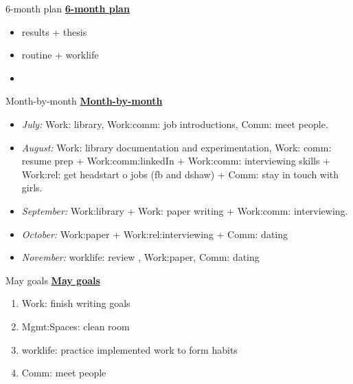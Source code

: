 \begin{columns}
\begin{column}{0.5\columnwidth}
\ifdefined\POSTER
    \begin{block}{6-month plan}
\else
\underline{\bf 6-month plan}
\fi
        \begin{itemize}
          \small \item \small results + thesis
          \item \small routine + worklife
          \item \small             
          \end{itemize}
\ifdefined\POSTER
    \end{block} 
\fi


\ifdefined\POSTER  
    \begin{block}{Month-by-month}
\else
\underline{\bf Month-by-month} 
\fi 
      \begin{itemize} 
      \item \small \textit{July:} Work: library, Work:comm: job
        introductions, Comm: meet people.
      \item \small \textit{August:} Work: library documentation and
      experimentation, Work: comm: resume prep + Work:comm:linkedIn +
      Work:comm: interviewing skills + Work:rel: get headstart o jobs (fb and dshaw) + Comm: stay in touch with girls. 
      \item \small \textit{September:} Work:library + Work: paper writing + Work:comm: interviewing. 
      \item \small \textit{October:} Work:paper +  Work:rel:interviewing + Comm: dating 
      \item \small \textit{November:} worklife: review , Work:paper, Comm: dating 
      \end{itemize}
\ifdefined\POSTER 
    \end{block}
\fi

\ifdefined\POSTER
\begin{block}{May goals}
\else
\underline{\bf May goals}\\
\fi 

\begin{enumerate} 
\item \small Work: finish writing goals
  \small \item \small Mgmt:Spaces: clean room 
\item \small worklife: practice implemented work to form habits 
\item \small Comm: meet people 
\end{enumerate}


\end{block}
\end{column}
\end{columns}
